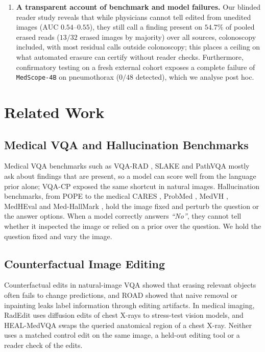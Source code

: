 \documentclass[journal]{IEEEtran}
\begin{document}
\begin{enumerate}[leftmargin=*,nosep]
    \item \textbf{A transparent account of benchmark and model failures.} Our blinded reader study reveals that while physicians cannot tell edited from unedited images ($\text{AUC } 0.54\text{--}0.55$), they still call a finding present on $54.7\%$ of pooled erased reads ($13/32$ erased images by majority) over all sources, colonoscopy included, with most residual calls outside colonoscopy; this places a ceiling on what automated erasure can certify without reader checks. Furthermore, confirmatory testing on a fresh external cohort exposes a complete failure of \texttt{MedScope-4B} on pneumothorax ($0/48$ detected), which we analyse post hoc.
\end{enumerate}



\section{Related Work}
\label{sec:related_work}
\subsection{Medical VQA and Hallucination Benchmarks}
\label{subsec:rw_benchmarks}
Medical VQA benchmarks such as VQA-RAD \citep{lau2018vqarad}, SLAKE \citep{liu2021slake} and PathVQA \citep{he2020pathvqa} mostly ask about findings that are present, so a model can score well from the language prior alone; VQA-CP \citep{agrawal2018vqacp} exposed the same shortcut in natural images. Hallucination benchmarks, from POPE \citep{li2023pope} to the medical CARES \citep{xia2024cares}, ProbMed \citep{yan2024probmed}, MedVH \citep{gu2024medvh}, MedHEval \citep{chang2024medheval} and Med-HallMark \citep{chen2024medhallmark}, hold the image fixed and perturb the question or the answer options. When a model correctly answers \emph{``No''}, they cannot tell whether it inspected the image or relied on a prior over the question. We hold the question fixed and vary the image.

\subsection{Counterfactual Image Editing}
\label{subsec:rw_counterfactual}
Counterfactual edits in natural-image VQA \citep{agarwal2020towards} showed that erasing relevant objects often fails to change predictions, and ROAD \citep{rong2022road} showed that naive removal or inpainting leaks label information through editing artifacts. In medical imaging, RadEdit \citep{perez2024radedit} uses diffusion edits of chest X-rays to stress-test vision models, and HEAL-MedVQA \citep{healmedvqa2024} swaps the queried anatomical region of a chest X-ray. Neither uses a matched control edit on the same image, a held-out editing tool or a reader check of the edits.
\end{document}
